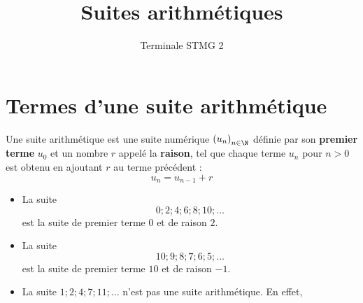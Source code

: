\documentclass{article}
\title{Suites arithmétiques}
\date{}
\author{Terminale STMG 2}
\begin{document}
\maketitle
\section{Termes d'une suite arithmétique}
\begin{tcolorbox}
\begin{definition}[Rappel]
Une suite arithmétique est une suite numérique $\left(u_n\right)_{n \in \N}$ définie par son \textbf{premier terme} $u_0$ et un nombre $r$ appelé la \textbf{raison}, tel que chaque terme $u_n$ pour $n > 0$ est obtenu en ajoutant $r$ au terme précédent :
\begin{equation*}
u_n = u_{n-1} + r
\end{equation*} 
\end{definition}
\end{tcolorbox}
\begin{example}
\begin{itemize}
\item La suite
\begin{equation*}
0; 2; 4; 6; 8; 10; \dots
\end{equation*}
est la suite de premier terme $0$ et de raison $2$.
\begin{center}
\end{center}
\item La suite 
\begin{equation*}
10; 9; 8; 7; 6; 5; \dots    
\end{equation*}
est la suite de premier terme $10$ et de raison $-1$.
\item La suite $1;2;4;7;11;\dots$ n'est pas une suite arithmétique. En effet,
\begin{center}
\end{center}
\end{itemize}
\end{example}
\end{document}
